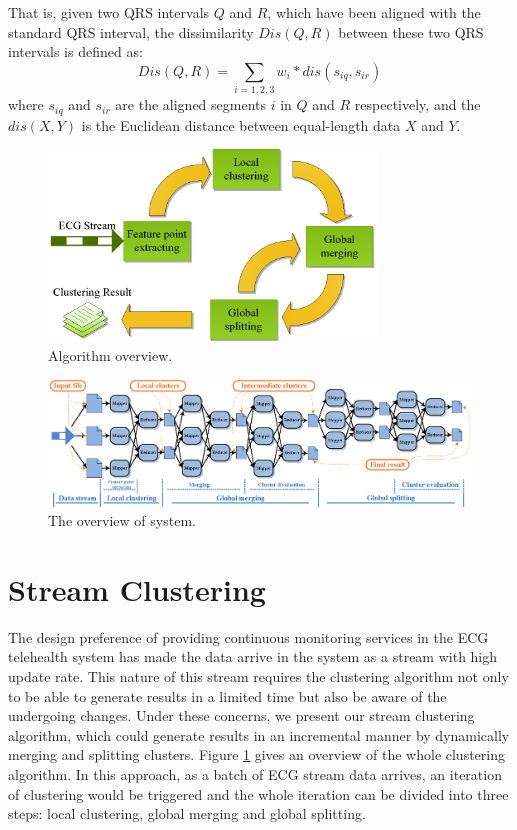\documentclass[conference]{IEEEtran}
\begin{document}
That is, given two QRS intervals $ Q $ and $ R $, which have been aligned with the standard QRS interval, the dissimilarity $ Dis(Q, R) $ between these two QRS intervals is defined as:
\begin{equation}\label{eq_dissimilarity}
Dis(Q, R) = \sum_{i=1,2,3}{w_i * dis(s_{iq}, s_{ir} )}
\end{equation}
where $ s_{iq} $ and $ s_{ir} $ are the aligned segments $ i $ in $ Q $ and $ R $ respectively, and the $ dis(X, Y) $ is the Euclidean distance between equal-length data $ X $ and $ Y $.

\begin{figure}[!t]
\centering
\includegraphics[height=2.0in]{./Figure/algorithm_overview.eps}
\caption{Algorithm overview.}
\label{fig_algorithm_overview}
\end{figure}

\begin{figure}[!t]
\centering
\includegraphics[width=7.1in]{./Figure/system_overview.eps}
\caption{The overview of system.}
\label{fig_sys_overview}
\end{figure}
\section{Stream Clustering}
The design preference of providing continuous monitoring services in the ECG telehealth system has made the data arrive in the system as a stream with high update rate. This nature of this stream requires the clustering algorithm not only to be able to generate results in a limited time but also be aware of the undergoing changes. Under these concerns, we present our stream clustering algorithm, which could generate results in an incremental manner by dynamically merging and splitting clusters. Figure \ref{fig_algorithm_overview} gives an overview of the whole clustering algorithm. In this approach, as a batch of ECG stream data arrives, an iteration of clustering would be triggered and the whole iteration can be divided into three steps: local clustering, global merging and global splitting.
\end{document}
